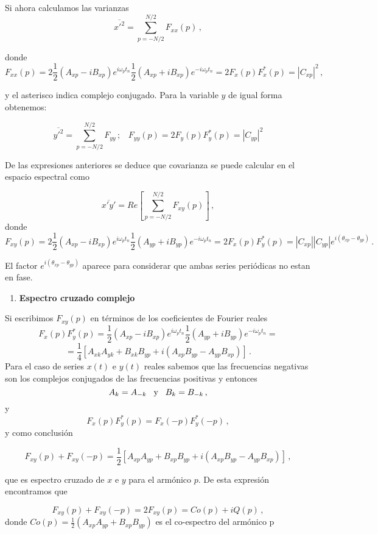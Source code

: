 \documentclass[
]{agujournal2019}
\providecommand{\tightlist}{%
  \setlength{\itemsep}{0pt}\setlength{\parskip}{0pt}}\usepackage{longtable,booktabs,array}
\begin{document}
Si ahora calculamos las varianzas
\[\overline{x'^2}=\sum\limits^{N/2}_{p=-N/2}F_{xx}(p)\,,\]

donde
\[F_{xx}(p)=2\frac{1}{2}\left(A_{xp} - iB_{xp} \right)e^{i\omega_p t_n}\frac{1}{2}\left(A_{xp} + iB_{xp} \right)e^{-i\omega_p t_n}
=2F_x(p) F^*_x(p)=|C_{xp}|^2\,,\]

y el asterisco indica complejo conjugado. Para la variable \(y\) de
igual forma obtenemos:

\[\overline{y'^2}=\sum\limits^{N/2}_{p=-N/2}F_{yy}\,;\,\,\,\,\,F_{yy}(p)=2F_y(p) F^*_y(p)=|C_{yp}|^2\]

De las expresiones anteriores se deduce que covarianza se puede calcular
en el espacio espectral como

\[\overline{x'y'}=Re\left[\sum\limits^{N/2}_{p=-N/2}F_{xy}(p)\right]\,,\]
donde
\[F_{xy}(p)=2\frac{1}{2}\left(A_{xp} - iB_{xp} \right)e^{i\omega_p t_n}\frac{1}{2}\left(A_{yp} + iB_{yp} \right)e^{-i\omega_p t_n}
=2F_x(p) F^*_y(p)=|C_{xp}||C_{yp}|e^{i(\theta_{xp}-\theta_{yp})}\,.\]

El factor \(e^{i(\theta_{xp}-\theta_{yp})}\) aparece para considerar que
ambas series periódicas no estan en fase.

\vspace{0.5cm}

\begin{enumerate}
\def\labelenumi{(\arabic{enumi})}
\setcounter{enumi}{3}
\tightlist
\item
  \textbf{Espectro cruzado complejo}
\end{enumerate}

Si escribimos \(F_{xy}(p)\) en términos de los coeficientes de Fourier
reales
\[F_x(p) F^*_y(p)=\frac{1}{2}\left(A_{xp} - iB_{xp} \right)e^{i\omega_p t_n}\frac{1}{2}\left(A_{yp} + iB_{yp} \right)e^{-i\omega_p t_n}=\]
\[=\frac{1}{4}\left[A_{xk}A_{yk}  + B_{xk}B_{yp} + i\left(A_{xp}B_{yp} - A_{yp}B_{xp}\right)\right]\,.\]
Para el caso de series \(x(t)\) e \(y(t)\) reales sabemos que las
frecuencias negativas son los complejos conjugados de las frecuencias
positivas y entonces
\[A_k=A_{-k}\,\,\,\,\,{\rm y}\,\,\,\,\,B_k=B_{-k}\,,\] y
\[F_x(p)F^*_y(p)=F_x(-p)F_y^*(-p)\,,\] y como conclusión

\[F_{xy}(p)+F_{xy}(-p)=\frac{1}{2}\left[ A_{xp}A_{yp}  + B_{xp}B_{yp} + i\left(A_{xp}B_{yp} - A_{yp}B_{xp}\right)\right]\,,\]

que es espectro cruzado de \(x\) e \(y\) para el armónico \(p\). De esta
expresión encontramos que

\[F_{xy}(p)+F_{xy}(-p)=2F_{xy}(p)=Co(p) + i Q(p)\,,\] donde
\(Co(p)=\frac{1}{2}( A_{xp}A_{yp} + B_{xp}B_{yp})\) es el co-espectro
del armónico p
\end{document}
